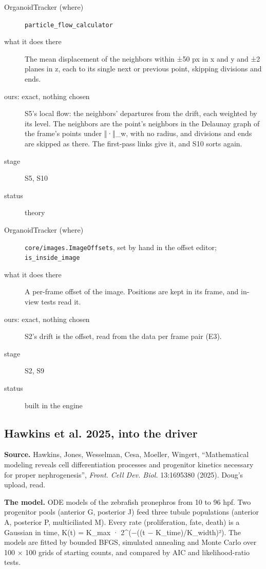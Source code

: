 \begin{description}
\item[{OrganoidTracker (where)}] \texttt{particle\_\allowbreak{}flow\_\allowbreak{}calculator}
\item[{what it does there}] The mean displacement of the neighbors within ±50 px in x and y and ±2 planes in z, each to its single next or previous point, skipping divisions and ends.
\item[{ours: exact, nothing chosen}] S5's local flow: the neighbors' departures from the drift, each weighted by its level. The neighbors are the point's neighbors in the Delaunay graph of the frame's points under ‖·‖\_\allowbreak{}w, with no radius, and divisions and ends are skipped as there. The first-pass links give it, and S10 sorts again.
\item[{stage}] S5, S10
\item[{status}] theory
\end{description}

\begin{description}
\item[{OrganoidTracker (where)}] \texttt{core/\allowbreak{}images.\allowbreak{}Image\allowbreak{}Offsets}, set by hand in the offset editor; \texttt{is\_\allowbreak{}inside\_\allowbreak{}image}
\item[{what it does there}] A per-frame offset of the image. Positions are kept in its frame, and in-view tests read it.
\item[{ours: exact, nothing chosen}] S2's drift is the offset, read from the data per frame pair (E3).
\item[{stage}] S2, S9
\item[{status}] built in the engine
\end{description}

\subsection{\texorpdfstring{Hawkins et al. 2025, into the driver}{Hawkins et al. 2025, into the driver}}

\textbf{Source.} Hawkins, Jones, Wesselman, Cesa, Moeller, Wingert, “Mathematical modeling reveals cell differentiation processes and progenitor kinetics necessary for proper nephrogenesis”, \emph{Front. Cell Dev. Biol.} 13:1695380 (2025). Doug's upload, read.

\textbf{The model.} ODE models of the zebrafish pronephros from 10 to 96 hpf. Two progenitor pools (anterior G, posterior J) feed three tubule populations (anterior A, posterior P, multiciliated M). Every rate (proliferation, fate, death) is a Gaussian in time, K(t) = K\_\allowbreak{}max · 2\textasciicircum{}(−((t − K\_\allowbreak{}time)/K\_\allowbreak{}width)²). The models are fitted by bounded BFGS, simulated annealing and Monte Carlo over 100 × 100 grids of starting counts, and compared by AIC and likelihood-ratio tests.

